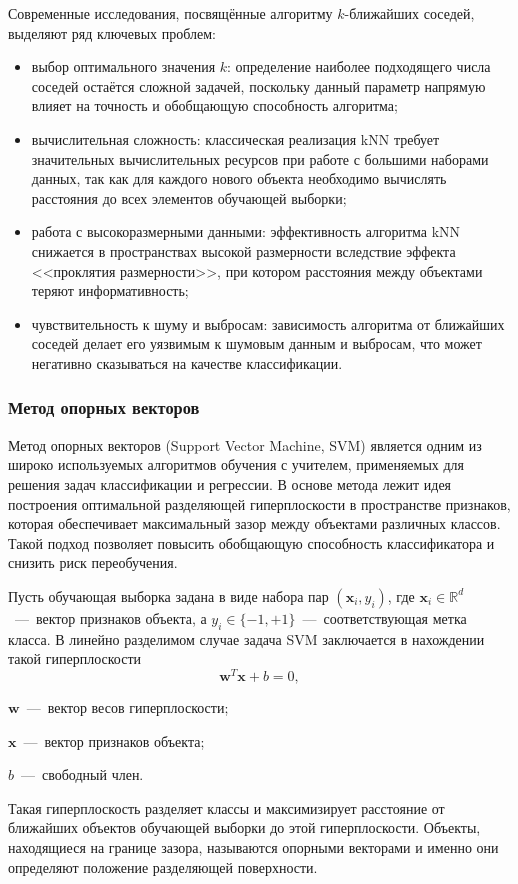 Современные исследования, посвящённые алгоритму $k$-ближайших соседей, выделяют ряд ключевых проблем:
\begin{itemize}[label=---, itemsep=0pt, parsep=0pt, topsep=0pt]
	\item выбор оптимального значения $k$: определение наиболее подходящего числа соседей остаётся сложной задачей, поскольку данный параметр напрямую влияет на точность и обобщающую способность алгоритма;
	\item вычислительная сложность: классическая реализация kNN требует значительных вычислительных ресурсов при работе с большими наборами данных, так как для каждого нового объекта необходимо вычислять расстояния до всех элементов обучающей выборки;
	\item работа с высокоразмерными данными: эффективность алгоритма kNN снижается в пространствах высокой размерности вследствие эффекта <<проклятия размерности>>, при котором расстояния между объектами теряют информативность;
	\item чувствительность к шуму и выбросам: зависимость алгоритма от ближайших соседей делает его уязвимым к шумовым данным и выбросам, что может негативно сказываться на качестве классификации.
\end{itemize}

\clearpage

\subsubsection{Метод опорных векторов}


Метод опорных векторов (Support Vector Machine, SVM) является одним из широко используемых алгоритмов обучения с учителем, применяемых для решения задач классификации и регрессии. В основе метода лежит идея построения оптимальной разделяющей гиперплоскости в пространстве признаков, которая обеспечивает максимальный зазор между объектами различных классов. Такой подход позволяет повысить обобщающую способность классификатора и снизить риск переобучения.

Пусть обучающая выборка задана в виде набора пар $(\mathbf{x}_i, y_i)$, где $\mathbf{x}_i \in \mathbb{R}^d$~---~вектор признаков объекта, а $y_i \in \{-1, +1\}$~---~соответствующая метка класса. В линейно разделимом случае задача SVM заключается в нахождении такой гиперплоскости
\begin{equation}
	\mathbf{w}^T \mathbf{x} + b = 0,
\end{equation}
\begin{formulaexplanation}
	\item $\mathbf{w}$~---~вектор весов гиперплоскости;
	\item $\mathbf{x}$~---~вектор признаков объекта;
	\item $b$~---~свободный член.
\end{formulaexplanation}
Такая гиперплоскость разделяет классы и максимизирует расстояние от ближайших объектов обучающей выборки до этой гиперплоскости. Объекты, находящиеся на границе зазора, называются опорными векторами и именно они определяют положение разделяющей поверхности.

